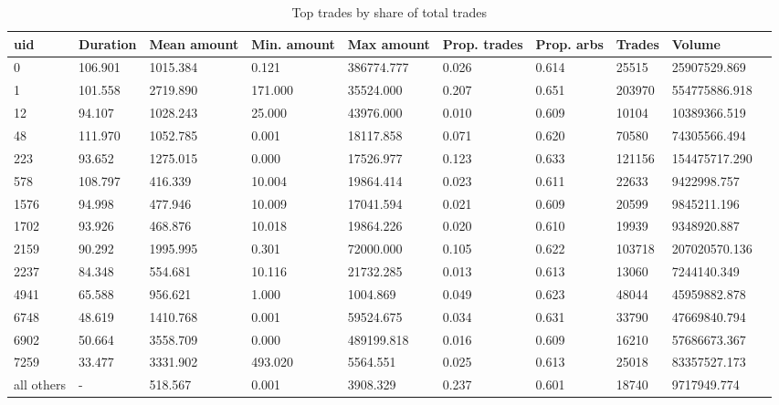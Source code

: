 \documentclass[]{scrartcl}
\begin{document}
	\begin{table}[htp]\scriptsize{
			\begin{tabular}{@{}llllllllll@{}}
				\toprule
				uid & Duration & Mean amount & Min. amount & Max amount & Prop. trades & Prop. arbs & Trades & Volume \\ \midrule
				0          & 106.901 & 1015.384 & 0.121   & 386774.777 & 0.026 & 0.614 & 25515  & 25907529.869  \\
				1          & 101.558 & 2719.890 & 171.000 & 35524.000  & 0.207 & 0.651 & 203970 & 554775886.918 \\
				12         & 94.107  & 1028.243 & 25.000  & 43976.000  & 0.010 & 0.609 & 10104  & 10389366.519  \\
				48         & 111.970 & 1052.785 & 0.001   & 18117.858  & 0.071 & 0.620 & 70580  & 74305566.494  \\
				223        & 93.652  & 1275.015 & 0.000   & 17526.977  & 0.123 & 0.633 & 121156 & 154475717.290 \\
				578        & 108.797 & 416.339  & 10.004  & 19864.414  & 0.023 & 0.611 & 22633  & 9422998.757   \\
				1576       & 94.998  & 477.946  & 10.009  & 17041.594  & 0.021 & 0.609 & 20599  & 9845211.196   \\
				1702       & 93.926  & 468.876  & 10.018  & 19864.226  & 0.020 & 0.610 & 19939  & 9348920.887   \\
				2159       & 90.292  & 1995.995 & 0.301   & 72000.000  & 0.105 & 0.622 & 103718 & 207020570.136 \\
				2237       & 84.348  & 554.681  & 10.116  & 21732.285  & 0.013 & 0.613 & 13060  & 7244140.349   \\
				4941       & 65.588  & 956.621  & 1.000   & 1004.869   & 0.049 & 0.623 & 48044  & 45959882.878  \\
				6748       & 48.619  & 1410.768 & 0.001   & 59524.675  & 0.034 & 0.631 & 33790  & 47669840.794  \\
				6902       & 50.664  & 3558.709 & 0.000   & 489199.818 & 0.016 & 0.609 & 16210  & 57686673.367  \\
				7259       & 33.477  & 3331.902 & 493.020 & 5564.551   & 0.025 & 0.613 & 25018  & 83357527.173  \\
				all others & -       & 518.567  & 0.001   & 3908.329   & 0.237 & 0.601 & 18740  & 9717949.774   \\ \bottomrule
			\end{tabular}
			\caption{Top trades by share of total trades\label{tab:trbp}}}
	\end{table}
	
\end{document}
